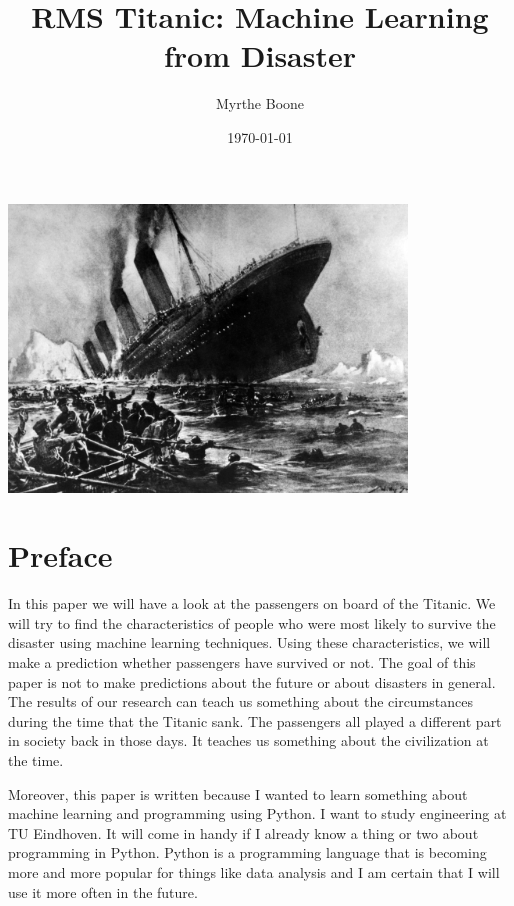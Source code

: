 \documentclass[11pt]{article}
\author{Myrthe Boone}
\date{\today}
\title{RMS Titanic: Machine Learning from Disaster}
\begin{document}
\maketitle


\begin{center}
\includegraphics[width=400]{./titanicfrontpage.png}
\end{center}

\newpage
\section{Preface}
\label{sec:org668c33e}
In this paper we will have a look at the passengers on board of the Titanic. We will try to find the characteristics of people who were most likely to survive the disaster using machine learning techniques. Using these characteristics, we will make a prediction whether passengers have survived or not. The goal of this paper is not to make predictions about the future or about disasters in general. The results of our research can teach us something about the circumstances during the time that the Titanic sank. The passengers all played a different part in society back in those days. It teaches us something about the civilization at the time. 

Moreover, this paper is written because I wanted to learn something about machine learning and programming using Python. I want to study engineering at TU Eindhoven. It will come in handy if I already know a thing or two about programming in Python. Python is a programming language that is becoming more and more popular for things like data analysis and I am certain that I will use it more often in the future.  
\end{document}
